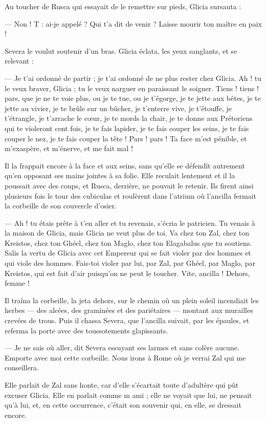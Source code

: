 \documentclass[a4paper, 11pt, oneside, polutonikogreek, french]{article}
\begin{document}
Au toucher de Rusca qui essayait de le remettre sur pieds, Glicia sursauta :

--- Non ! T : ai-je appelé ? Qui t'a dit de venir ? Laisse mourir ton maître en paix !

Severa le voulut soutenir d'un bras. Glicia éclata, les yeux sanglants, et se relevant :

--- Je t'ai ordonné de partir ; je t'ai ordonné de ne plus rester chez Glicia. Ah ! tu le veux braver, Glicia ; tu le veux narguer en paraissant le soigner. Tiens ! tiens ! pars, que je ne te voie plus, ou je te tue, ou je t'égorge, je te jette aux bêtes, je te jette au vivier, je te brûle sur un bûcher, je t'enterre vive, je t'étouffe, je t'étrangle, je t'arrache le cœur, je te mords la chair, je te donne aux Prétoriens qui te violeront cent fois, je te fais lapider, je te fais couper les seins, je te fais couper le nez, je te fais couper la tête ! Pars ! pars ! Ta face m'est pénible, et m'exaspère, et m'énerve, et me fait mal !

Il la frappait encore à la face et aux seins, sans qu'elle se défendît autrement qu'en opposant ses mains jointes à sa folie. Elle reculait lentement et il la poussait avec des coups, et Rusca, derrière, ne pouvait le retenir. Ils firent ainsi plusieurs fois le tour des cubiculas et roulèrent dans l'atrium où l'ancilla fermait la corbeille de son couvercle d'osier.

--- Ah ! tu étais prête à t'en aller et tu revenais, s'écria le patricien. Tu venais à la maison de Glicia, mais Glicia ne veut plus de toi. Va chez ton Zal, chez ton Kreistos, chez ton Ghéel, chez ton Maglo, chez ton Elagabalus que tu soutiens. Salis la vertu de Glicia avec cet Empereur qui se fait violer par des hommes et qui viole des hommes. Fais-toi violer par lui, par Zal, par Ghéel, par Maglo, par Kreistos, qui est fait d'air puisqu'on ne peut le toucher. Vite, ancilla ! Dehors, femme !

Il traîna la corbeille, la jeta dehors, sur le chemin où un plein soleil incendiait les herbes --- des alcées, des graminées et des pariétaires --- montant aux murailles crevées de trous. Puis il chassa Severa, que l'ancilla suivait, par les épaules, et referma la porte avec des toussotements glapissants.

--- Je ne sais où aller, dit Severa essuyant ses larmes et sans colère aucune. Emporte avec moi cette corbeille. Nous irons à Rome où je verrai Zal qui me conseillera.

Elle parlait de Zal sans honte, car d'elle s'écartait toute d'adultère qui pût excuser Glicia. Elle en parlait comme m ami ; elle ne voyait que lui, ne pensait qu'à lui, et, en cette occurrence, c'était son souvenir qui, en elle, se dressait encore.
\end{document}
